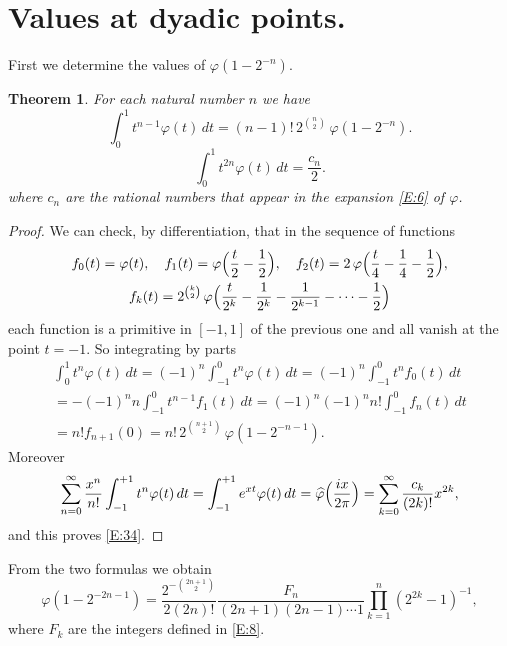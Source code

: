\documentclass[10pt]{amsart}
\newtheorem{thm}{Theorem}
\theoremstyle{definition}
\theoremstyle{remark}
\begin{document}
\section{Values at dyadic points.}
First we determine the values of $\varphi(1-2^{-n})$.
\begin{thm}\label{T:6}
For each natural number $n$ we have
\begin{equation}\label{E:33}
\int_0^1t^{n-1}\varphi(t)\,dt=(n-1)!\,2^{\binom{n}{2}}\,\varphi(1-2^{-n}).
\end{equation}
\begin{equation}\label{E:34}
\int_0^1t^{2n}\varphi(t)\,dt=\frac{c_n}{2}.
\end{equation}
where $c_n$ are the rational numbers that appear in the expansion \eqref{E:6} of 
$\varphi$.
\end{thm}
\begin{proof}
We can check, by differentiation, that in the sequence of functions 
\begin{gather*}
f_0(t)=\varphi(t),\quad f_1(t)=\varphi\Bigl(\frac{t}{2}-\frac{1}{2}\Bigr),\quad
f_2(t)=2\,\varphi\Bigl(\frac{t}{4}-\frac{1}{4}-\frac{1}{2}\Bigr),\\
f_k(t)=2^{\binom{k}{2}}\,\varphi\Bigl(\frac{t}{2^k}-\frac{1}{2^k}-\frac{1}{2^{k-1}}-
\cdots-\frac{1}{2}\Bigr)
\end{gather*}
each function is a primitive in $[-1,1]$ of the previous one and all vanish at the point
$t=-1$. So integrating by parts
\begin{multline*}
\int_0^1t^n\varphi(t)\,dt=(-1)^n \int_{-1}^0t^n\varphi(t)\,dt=
(-1)^n\int_{-1}^0 t^nf_0(t)\,dt\\
=-(-1)^n n \int_{-1}^0 t^{n-1}f_1(t)\,dt=
(-1)^n(-1)^n n! \int_{-1}^0 f_n(t)\,dt\\=n! f_{n+1}(0)=n!\, 2^{\binom{n+1}{2}}\,
\varphi(1-2^{-n-1}).
\end{multline*}
Moreover
\[\sum_{n=0}^\infty \frac{x^n}{n!}\int_{-1}^{+1}t^n\varphi(t)\,dt=
\int_{-1}^{+1}e^{xt}\varphi(t)\,dt=\widehat\varphi\Bigl(\frac{ix}{2\pi}\Bigr)=
\sum_{k=0}^\infty \frac{c_k}{(2k)!}x^{2k},\]
and this proves \eqref{E:34}.
\end{proof}
From the two formulas we obtain
\begin{equation}\label{E:35}
\varphi(1-2^{-2n-1})=\frac{2^{-\binom{2n+1}{2}}}{2 (2n)!}\frac{F_n}{(2n+1)(2n-1)\cdots1}
\prod_{k=1}^n(2^{2k}-1)^{-1},
\end{equation}
where $F_k$ are the integers defined in \eqref{E:8}.
\end{document}
